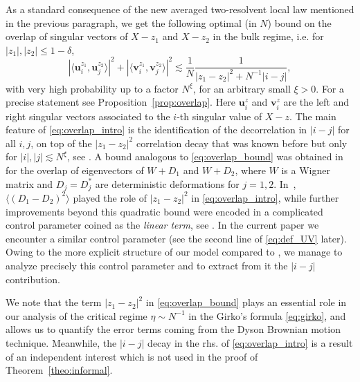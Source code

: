 \documentclass[10pt]{amsart}
\numberwithin{equation}{section}
\begin{document}
As a standard consequence of the new averaged two-resolvent local law mentioned in the previous paragraph, we get the following optimal (in $N$) bound on the overlap of singular vectors of $X-z_1$ and $X-z_2$ in the bulk regime, i.e. for $|z_1|, |z_2|\le 1-\delta$,
\begin{equation}
\left\vert \langle \bm{u}_i^{z_1},\bm{u}_j^{z_2}\rangle\right\vert^2 + \left\vert \langle \bm{v}_i^{z_1},\bm{v}_j^{z_2}\rangle\right\vert^2 \lesssim \frac{1}{N}\frac{1}{|z_1-z_2|^2+N^{-1}|i-j|},
\label{eq:overlap_intro}
\end{equation}
with very high probability up to a factor $N^\xi$, for an arbitrary small $\xi>0$. For a precise statement see Proposition~\ref{prop:overlap}. Here $\bm{u}_i^z$ and $\bm{v}_i^z$ are the left and right singular vectors associated to the $i$-th singular value of $X-z$. The main feature of \eqref{eq:overlap_intro} is the identification of the decorrelation in $|i-j|$ for all $i,j$, on top of the $|z_1-z_2|^2$ correlation decay that was known before but only for $|i|,|j|\lesssim N^\xi$, see \cite[Corollary~3.6]{nonHermdecay}. A bound analogous to \eqref{eq:overlap_bound} was obtained in \cite[Theorem~2.6]{eigenv_decorr} for the overlap of eigenvectors of $W+D_1$ and $W+D_2$, where $W$ is a Wigner matrix and $D_j=D_j^*$ are deterministic deformations for $j=1,2$. In~\cite{eigenv_decorr}, $\langle (D_1-D_2)^2\rangle$ played the role of $|z_1-z_2|^2$ in \eqref{eq:overlap_intro}, while further improvements beyond this quadratic bound were encoded in a complicated control parameter coined as the \emph{linear term}, see \cite[Eq.(2,17)]{eigenv_decorr}. In the current paper we encounter a similar control parameter (see the second line of \eqref{eq:def_UV} later). Owing to the more explicit structure of our model compared to \cite{eigenv_decorr}, we manage to analyze precisely this control parameter and to extract from it the $|i-j|$ contribution.
  
We note that the term $|z_1-z_2|^2$ in \eqref{eq:overlap_bound} plays an essential role in our analysis of the critical regime $\eta\sim N^{-1}$ in the Girko's formula \eqref{eq:girko}, and allows us to quantify the error terms coming from the Dyson Brownian motion technique.  Meanwhile, the $|i-j|$ decay in the rhs. of \eqref{eq:overlap_intro} is a result of an independent interest which is not used in the proof of Theorem~\ref{theo:informal}.
\end{document}
